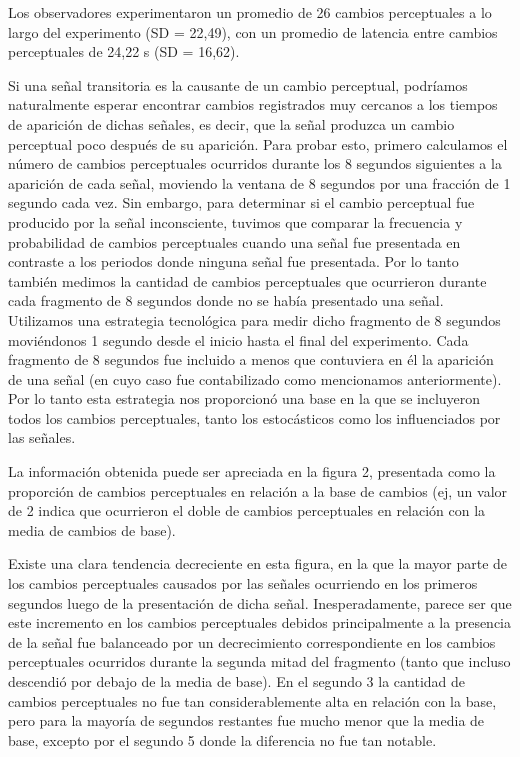 \documentclass[jou]{apa6}
\begin{document}
Los observadores experimentaron un promedio de 26 cambios perceptuales a lo largo del
experimento (SD = 22,49), con un promedio de latencia entre cambios perceptuales de 24,22
s (SD = 16,62).

Si una señal transitoria es la causante de un cambio perceptual, podríamos naturalmente
esperar encontrar cambios registrados muy cercanos a los tiempos de aparición de dichas
señales, es decir, que la señal produzca un cambio perceptual poco después de su aparición.
Para probar esto, primero calculamos el número de cambios perceptuales ocurridos durante
los 8 segundos siguientes a la aparición de cada señal, moviendo la ventana de 8 segundos
por una fracción de 1 segundo cada vez. Sin embargo, para determinar si el cambio
perceptual fue producido por la señal inconsciente, tuvimos que comparar la frecuencia y
probabilidad de cambios perceptuales cuando una señal fue presentada en contraste a los
periodos donde ninguna señal fue presentada. Por lo tanto también medimos la cantidad de
cambios perceptuales que ocurrieron durante cada fragmento de 8 segundos donde no se
había presentado una señal. Utilizamos una estrategia tecnológica para medir dicho
fragmento de 8 segundos moviéndonos 1 segundo desde el inicio hasta el final del
experimento. Cada fragmento de 8 segundos fue incluido a menos que contuviera en él la
aparición de una señal (en cuyo caso fue contabilizado como mencionamos anteriormente).
Por lo tanto esta estrategia nos proporcionó una base en la que se incluyeron todos los
cambios perceptuales, tanto los estocásticos como los influenciados por las señales.

La información obtenida puede ser apreciada en la figura 2, presentada como la
proporción de cambios perceptuales en relación a la base de cambios (ej, un valor de 2 indica
que ocurrieron el doble de cambios perceptuales en relación con la media de cambios de
base).

Existe una clara tendencia decreciente en esta figura, en la que la mayor parte de los
cambios perceptuales causados por las señales ocurriendo en los primeros segundos luego de
la presentación de dicha señal. Inesperadamente, parece ser que este incremento en los
cambios perceptuales debidos principalmente a la presencia de la señal fue balanceado por un
decrecimiento correspondiente en los cambios perceptuales ocurridos durante la segunda
mitad del fragmento (tanto que incluso descendió por debajo de la media de base). En el
segundo 3 la cantidad de cambios perceptuales no fue tan considerablemente alta en relación
con la base, pero para la mayoría de segundos restantes fue mucho menor que la media de
base, excepto por el segundo 5 donde la diferencia no fue tan notable.
\end{document}
